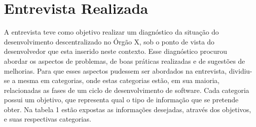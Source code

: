 \section{Entrevista Realizada}
A entrevista teve como objetivo realizar um diagnóstico da situação do desenvolvimento descentralizado no Órgão X, sob o ponto de vista do desenvolvedor que esta inserido neste contexto. Esse diagnóstico procurou abordar os aspectos de problemas, de boas práticas realizadas e de sugestões de melhorias. Para que esses aspectos pudessem ser abordados na entrevista, dividiu-se a mesma em categorias, onde estas categorias estão, em sua maioria, relacionadas as fases de um ciclo de desenvolvimento de software. Cada categoria possui um objetivo, que representa qual o tipo de informação que se pretende obter. Na tabela 1 estão expostas as informações desejadas, através dos objetivos, e suas respectivas categorias.

